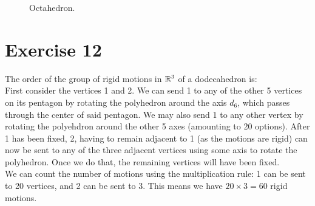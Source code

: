 \documentclass[12pt]{article}
\begin{document}
\begin{figure}[H]

        \caption{\label{fig:figure1} Octahedron.}
    \end{figure}


    \section*{Exercise 12}
    The order of the group of rigid motions in $\mathbb{R}^3$ of a dodecahedron is: \\
    First consider the vertices 1 and 2.
    We can send 1 to any of the other 5 vertices on its pentagon by
    rotating the polyhedron around the axis $d_6$, which passes through
    the center of said pentagon. We may also send 1 to any other vertex
    by rotating the polyehdron around the other 5 axes (amounting to 20 
    options).
    After 1 has been fixed, 2, having to remain adjacent to 1 (as the
    motions are rigid) can now be sent to any of the three adjacent vertices
    using some axis to rotate the polyhedron. Once we do that, the
    remaining vertices will have been fixed. \\
    We can count the number of motions using the multiplication rule:
    1 can be sent to 20 vertices, and 2 can be sent to 3. This means we
    have $20 \times 3 = 60$ rigid motions. 
\end{document}

